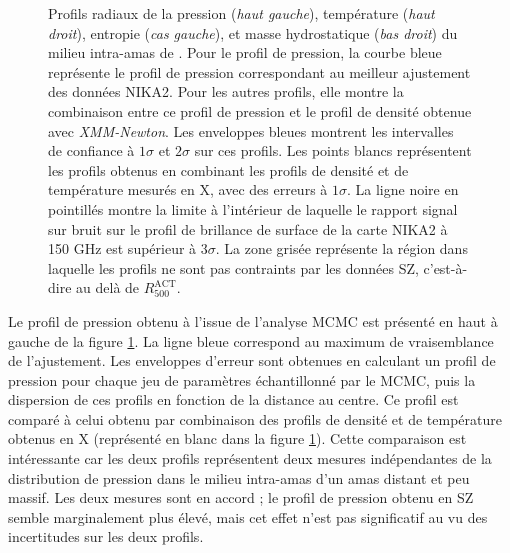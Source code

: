\begin{figure}[t]
    \caption{
        Profils radiaux de la pression (\textit{haut gauche}), température (\textit{haut droit}), entropie (\textit{cas gauche}), et masse hydrostatique (\textit{bas droit}) du milieu intra-amas de \act.
        Pour le profil de pression, la courbe bleue représente le profil de pression correspondant au meilleur ajustement des données NIKA2.
        Pour les autres profils, elle montre la combinaison entre ce profil de pression et le profil de densité obtenue avec \textit{XMM-Newton}.
        Les enveloppes bleues montrent les intervalles de confiance à $1\sigma$ et $2\sigma$ sur ces profils.
        Les points blancs représentent les profils obtenus en combinant les profils de densité et de température mesurés en X, avec des erreurs à $1\sigma$.
        La ligne noire en pointillés montre la limite à l'intérieur de laquelle le rapport signal sur bruit sur le profil de brillance de surface de la carte NIKA2 à 150 GHz est supérieur à $3\sigma$.
        La zone grisée représente la région dans laquelle les profils ne sont pas contraints par les données SZ, c'est-à-dire au delà de $R_{500}^\mathrm{ACT}$.
        }
        \label{fig:act:profiles}
\end{figure}

Le profil de pression obtenu à l'issue de l'analyse MCMC est présenté en haut à gauche de la figure \ref{fig:act:profiles}.
La ligne bleue correspond au maximum de vraisemblance de l'ajustement.
Les enveloppes d'erreur sont obtenues en calculant un profil de pression pour chaque jeu de paramètres échantillonné par le MCMC, puis la dispersion de ces profils en fonction de la distance au centre.
%
Ce profil est comparé à celui obtenu par combinaison des profils de densité et de température obtenus en X (représenté en blanc dans la figure \ref{fig:act:profiles}).
Cette comparaison est intéressante car les deux profils représentent deux mesures indépendantes de la distribution de pression dans le milieu intra-amas d'un amas distant et peu massif.
Les deux mesures sont en accord ; le profil de pression obtenu en SZ semble marginalement plus élevé, mais cet effet n'est pas significatif au vu des incertitudes sur les deux profils.

